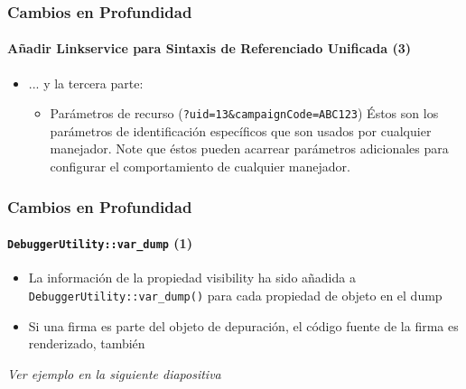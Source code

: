 \begin{frame}[fragile]
	\frametitle{Cambios en Profundidad}
	\framesubtitle{Añadir Linkservice para Sintaxis de Referenciado Unificada (3)}

	\begin{itemize}

		\item ... y la tercera parte:

			\begin{itemize}

				\item Parámetros de recurso (\texttt{?uid=13\&campaignCode=ABC123})\newline
					Éstos son los parámetros de identificación específicos que son usados por cualquier manejador.
					Note que éstos pueden acarrear parámetros adicionales para configurar el comportamiento de cualquier manejador.

			\end{itemize}

	\end{itemize}

\end{frame}

\begin{frame}[fragile]
	\frametitle{Cambios en Profundidad}
	\framesubtitle{\texttt{DebuggerUtility::var\_dump} (1)}

	\begin{itemize}

		\item La información de la propiedad visibility ha sido añadida a \texttt{DebuggerUtility::var\_dump()}
			\newline
			para cada propiedad de objeto en el dump

		\item Si una firma es parte del objeto de depuración, el código fuente de la firma es renderizado, también

	\end{itemize}

	\tabto{0.75cm}\textit{Ver ejemplo en la siguiente diapositiva}

\end{frame}

